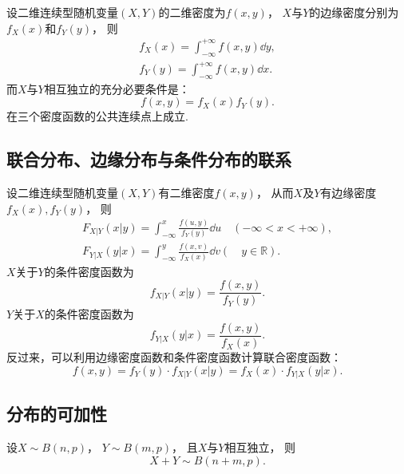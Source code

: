 设二维连续型随机变量\((X,Y)\)的二维密度为\(f(x,y)\)，
\(X\)与\(Y\)的边缘密度分别为\(f_X(x)\)和\(f_Y(y)\)，
则\begin{align*}
	f_X(x) = \int_{-\infty}^{+\infty} f(x,y) \dd{y}, \\
	f_Y(y) = \int_{-\infty}^{+\infty} f(x,y) \dd{x}.
\end{align*}
而\(X\)与\(Y\)相互独立的充分必要条件是：\begin{equation*}
	f(x,y) = f_X(x) f_Y(y).
\end{equation*}在三个密度函数的公共连续点上成立.

\subsection*{联合分布、边缘分布与条件分布的联系}
设二维连续型随机变量\((X,Y)\)有二维密度\(f(x,y)\)，
从而\(X\)及\(Y\)有边缘密度\(f_X(x),f_Y(y)\)，
则\begin{gather*}
	F_{X \vert Y}(x \vert y)
	= \int_{-\infty}^x \frac{f(u,y)}{f_Y(y)}\dd{u}
	\quad(-\infty < x < +\infty), \\
	F_{Y \vert X}(y \vert x)
	= \int_{-\infty}^y \frac{f(x,v)}{f_X(x)}\dd{v}
	(\quad y \in \mathbb{R}).
\end{gather*}
\(X\)关于\(Y\)的条件密度函数为\begin{equation*}
	f_{X \vert Y}(x \vert y)
	= \frac{f(x,y)}{f_Y(y)}.
\end{equation*}
\(Y\)关于\(X\)的条件密度函数为\begin{equation*}
	f_{Y \vert X}(y \vert x)
	= \frac{f(x,y)}{f_X(x)}.
\end{equation*}
反过来，可以利用边缘密度函数和条件密度函数计算联合密度函数：\begin{equation*}
	f(x,y) = f_Y(y) \cdot f_{X \vert Y}(x \vert y)
	= f_X(x) \cdot f_{Y \vert X}(y \vert x).
\end{equation*}

\subsection*{分布的可加性}
设\(X \sim B(n,p)\)，
\(Y \sim B(m,p)\)，
且\(X\)与\(Y\)相互独立，
则\begin{equation*}
	X+Y \sim B(n+m,p).
\end{equation*}

